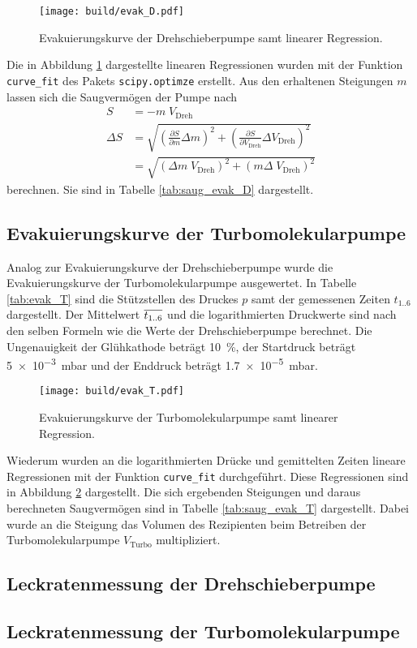 \begin{figure}
  \centering
  \texttt{[image: build/evak\_D.pdf]}
  \caption{Evakuierungskurve der Drehschieberpumpe samt linearer Regression.}
  \label{fig:evak_D}
\end{figure}

Die in Abbildung \ref{fig:evak_D} dargestellte linearen Regressionen wurden
mit der Funktion \texttt{curve\_fit} des Pakets \texttt{scipy.optimze} \cite{scipy}
erstellt. Aus den erhaltenen Steigungen $m$ lassen sich die Saugvermögen der Pumpe
nach
\begin{align*}
    S &= - m \; V_\text{Dreh} \\
    \Delta S &=
    \sqrt{\left(\frac{\partial S}{\partial m} \Delta m\right)^2 +
    \left(\frac{\partial S}{\partial V_\text{Dreh}} \Delta V_\text{Dreh}\right)^2} \\
    &=
    \sqrt{\left(\Delta m \; V_\text{Dreh}\right)^2 +
    \left(m \Delta \; V_\text{Dreh}\right)^2}
\end{align*}
berechnen. Sie sind in Tabelle \ref{tab:saug_evak_D} dargestellt.


\FloatBarrier


\subsection{Evakuierungskurve der Turbomolekularpumpe}
\label{sec:AuswEvaT}

Analog zur Evakuierungskurve der Drehschieberpumpe wurde die Evakuierungskurve
der Turbomolekularpumpe ausgewertet. In Tabelle \ref{tab:evak_T} sind die
Stützstellen des Druckes $p$ samt der gemessenen Zeiten $t_\text{1..6}$
dargestellt. Der Mittelwert $\overline{t_\text{1..6}}$ und die logarithmierten
Druckwerte sind nach den selben Formeln wie die Werte der Drehschieberpumpe
berechnet. Die Ungenauigkeit der Glühkathode beträgt \SI{10}{\percent}, der
Startdruck beträgt \SI{5e-3}{\milli\bar} und der Enddruck beträgt
\SI{1.7e-5}{\milli\bar}.



\begin{figure}
  \centering
  \texttt{[image: build/evak\_T.pdf]}
  \caption{Evakuierungskurve der Turbomolekularpumpe samt linearer Regression.}
  \label{fig:evak_T}
\end{figure}

Wiederum wurden an die logarithmierten Drücke und gemittelten Zeiten
lineare Regressionen mit der Funktion \texttt{curve\_fit} durchgeführt.
Diese Regressionen sind in Abbildung \ref{fig:evak_T} dargestellt.
Die sich ergebenden Steigungen und daraus berechneten Saugvermögen sind in
Tabelle \ref{tab:saug_evak_T} dargestellt. Dabei wurde an die Steigung das
Volumen des Rezipienten beim Betreiben der Turbomolekularpumpe $V_\text{Turbo}$
multipliziert.




\subsection{Leckratenmessung der Drehschieberpumpe}
\label{sec:AuswLeckD}

\subsection{Leckratenmessung der Turbomolekularpumpe}
\label{sec:AuswLeckT}
